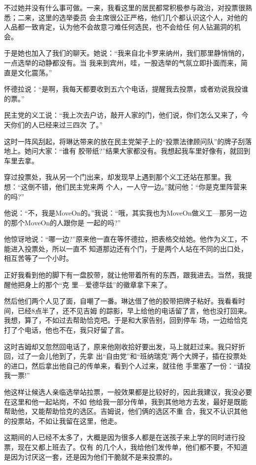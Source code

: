 ﻿\documentclass[11pt]{article}
\begin{document}
不过她并没有什么事可做。一来，我看这里的居民都常积极参与政治，对投票很熟悉；二来，这里的选举委员
会主席很公正严格，他们几个都认识这个人，对他的人品都一致肯定，认为他不会故意刁难任何选民，也不会给任
何人钻漏洞的机会。

于是她也加入了我们的聊天。她说：``我来自北卡罗来纳州，我们那里静悄悄的，一点选举的动静都没有。当
我来到宾州，哇，一股选举的气氛立即扑面而来，简直是文化震荡。''


怀德拉说：``是啊，我每天都要收到五六个电话，提醒我去投票，或者劝说我投谁的票。''

民主党的义工说：``我上次去户访，敲开人家的门，他们说，你们怎么又来了，今天你们的人已经来过三四次
了。''

这时一阵风刮起，将琳达带来的放在民主党架子上的``投票法律顾问队''的牌子刮落地上。她问大家：``谁有
胶带纸?''结果大家都没有。我想起我车里好像有，就回到车里去拿。

穿过投票处，我从另一个门出来，却发现早上遇到那个义工还站在那里。我想：``这倒不错，他们民主党来两
个人，一人守一边。''就问他：``你是克里阵营来的吗?''

他说：``不，我是MoveOn的。''我说：``哦，其实我也为MoveOn做义工---那另一边的那个MoveOn的人跟你是
一起的吗?''

他惊讶地说：``哪一边?''原来他一直在等怀德拉，把表格交给她。他作为义工，不能进入投票处，所以一直不
知道那边还有个门，于是两个人站在不同的出口处，相互苦等了一个小时。

正好我看到他的脚下有一盘胶带，就让他带着所有的东西，跟我进去。当然，我提醒他把身上的那个``克
里---爱德华兹''的徽章拿下来了。

然后他们两个人见了面，自嘲了一番。琳达借了他的胶带把牌子粘好。我看看时间，已经8点半了，还不见吉姆
的踪影，早上给他的电话留了言，他也没打回来。我想，算了，不如过去帮助恰克吧。于是和大家告别，回到停车
场，一边给恰克打了个电话，他也不在，我只好留了言。

这时吉姆却又忽然回电话了，原来他刚收拾好要出发，马上就赶过来。我只好折回，过了一会儿他到了，先拿
出``自由党''和``班纳瑞克''两个大牌子，插在投票处的进口，然后拿出他自己的传单来，看到个人过来，就往他
手里塞了一份：``请投我一票!''

他这样让候选人亲临选举站拉票，一般效果都是比较好的，因此我建议，我没必要在这里和他一起站岗，不如
他给我一部分传单，我到其他地方去发，最好是既能帮助他，又能帮助恰克的选区。吉姆说，他们俩的选区不重
合，我又不认识其他的投票站，不如让我留在这里，他走。

这期间的人已经不太多了，大概是因为很多人都是在送孩子来上学的同时进行投票，现在又都上班去了。仅有
的几个人，我给他们发传单，他们都不要，不知道是因为讨厌这一套，还是因为他们干脆就不是来投票的。
\end{document}
